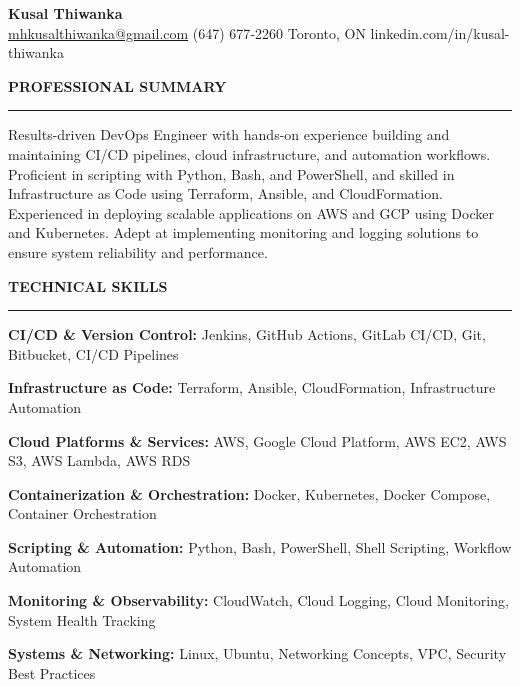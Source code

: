 \documentclass[10pt,letterpaper]{article}
\begin{document}
\begin{center}
{\LARGE\textbf{Kusal Thiwanka}}\\[3pt]
\href{mailto:mhkusalthiwanka@gmail.com}{mhkusalthiwanka@gmail.com}\hspace{2em}%
(647) 677{-}2260\hspace{2em}%
Toronto, ON\hspace{2em}
linkedin.com/in/kusal-thiwanka
\end{center}

\vspace{6pt}

\textbf{PROFESSIONAL SUMMARY}\\[-8pt]
\noindent\rule{\textwidth}{1pt}

\vspace{-2pt}

Results-driven DevOps Engineer with hands-on experience building and maintaining CI/CD pipelines, cloud infrastructure, and automation workflows. Proficient in scripting with Python, Bash, and PowerShell, and skilled in Infrastructure as Code using Terraform, Ansible, and CloudFormation. Experienced in deploying scalable applications on AWS and GCP using Docker and Kubernetes. Adept at implementing monitoring and logging solutions to ensure system reliability and performance.

\vspace{8pt}

\textbf{TECHNICAL SKILLS}\\[-8pt]
\noindent\rule{\textwidth}{1pt}

\vspace{-2pt}

\textbf{CI/CD \& Version Control:} Jenkins, GitHub Actions, GitLab CI/CD, Git, Bitbucket, CI/CD Pipelines

\textbf{Infrastructure as Code:} Terraform, Ansible, CloudFormation, Infrastructure Automation

\textbf{Cloud Platforms \& Services:} AWS, Google Cloud Platform, AWS EC2, AWS S3, AWS Lambda, AWS RDS

\textbf{Containerization \& Orchestration:} Docker, Kubernetes, Docker Compose, Container Orchestration

\textbf{Scripting \& Automation:} Python, Bash, PowerShell, Shell Scripting, Workflow Automation

\textbf{Monitoring \& Observability:} CloudWatch, Cloud Logging, Cloud Monitoring, System Health Tracking

\textbf{Systems \& Networking:} Linux, Ubuntu, Networking Concepts, VPC, Security Best Practices
\end{document}

